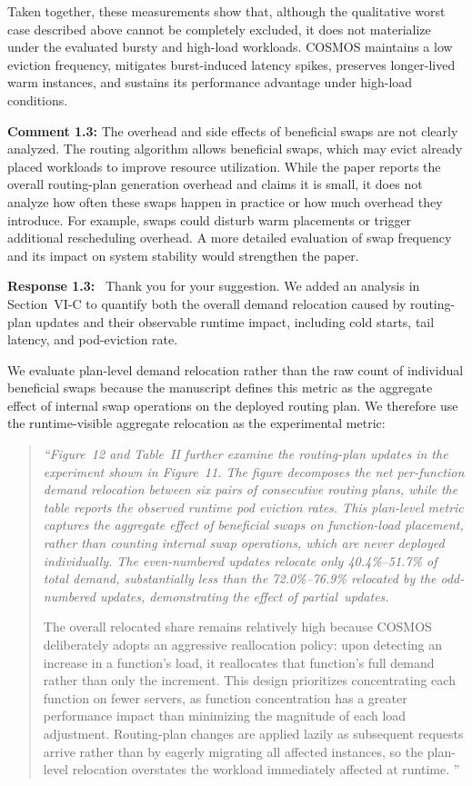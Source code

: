 \documentclass[11pt]{article}
\newcommand{\sysname}{COSMOS\xspace}
\newcommand{\response}[1]{\par\medskip\noindent\textbf{Response #1:}\ }
\newenvironment{revisionquote}{\begin{quote}\itshape}{\end{quote}}
\begin{document}
Taken together, these measurements show that, although the qualitative worst case described above cannot be completely excluded, it does not materialize under the evaluated bursty and high-load workloads. \sysname maintains a low eviction frequency, mitigates burst-induced latency spikes, preserves longer-lived warm instances, and sustains its performance advantage under high-load conditions.

\begin{reviewcomment}
\textbf{Comment 1.3:} The overhead and side effects of beneficial swaps are not clearly analyzed. The routing algorithm allows beneficial swaps, which may evict already placed workloads to improve resource utilization. While the paper reports the overall routing-plan generation overhead and claims it is small, it does not analyze how often these swaps happen in practice or how much overhead they introduce. For example, swaps could disturb warm placements or trigger additional rescheduling overhead. A more detailed evaluation of swap frequency and its impact on system stability would strengthen the paper.
\end{reviewcomment}
\response{1.3} Thank you for your suggestion. We added an analysis in Section~VI-C to quantify both the overall demand relocation caused by routing-plan updates and their observable runtime impact, including cold starts, tail latency, and pod-eviction rate.

We evaluate plan-level demand relocation rather than the raw count of individual beneficial swaps because the manuscript defines this metric as the aggregate effect of internal swap operations on the deployed routing plan. We therefore use the runtime-visible aggregate relocation as the experimental metric:

\begin{revisionquote}
``Figure~12 and Table~II further examine the routing-plan updates in the
experiment shown in Figure~11. The figure
decomposes the net per-function demand relocation between six pairs of
consecutive routing plans, while the table reports the observed runtime pod
eviction rates. This plan-level metric captures the aggregate effect of
beneficial swaps on function-load placement, rather than counting internal swap
operations, which are never deployed individually. The even-numbered updates relocate
only 40.4\%--51.7\% of total demand,
substantially less than the 72.0\%--76.9\% relocated by the odd-numbered updates,
demonstrating the effect of partial~updates.

The overall relocated share remains relatively high because \sysname deliberately
adopts an aggressive reallocation policy: upon detecting an increase in a
function's load, it reallocates that function's full demand rather than only the
increment. This design prioritizes concentrating each function on fewer servers,
as function concentration has a greater performance impact than minimizing the
magnitude of each load adjustment. Routing-plan changes are applied lazily as subsequent requests arrive rather than by eagerly migrating all affected instances, so the plan-level relocation overstates the workload immediately affected at runtime. ''
\end{revisionquote}
\end{document}
